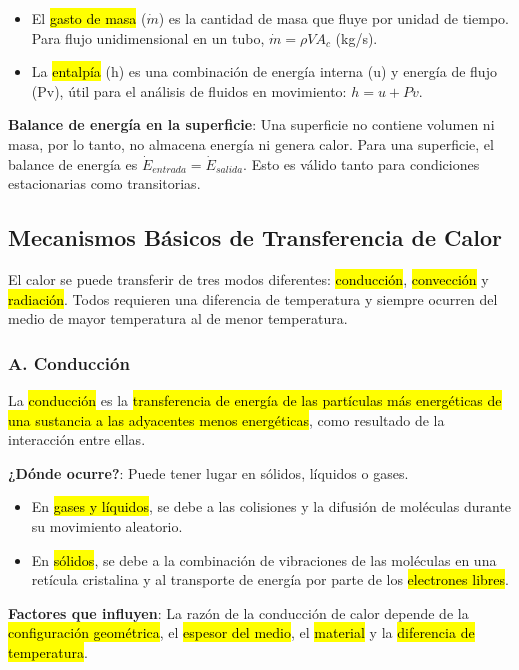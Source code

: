 \documentclass{article}
\begin{document}
    \begin{itemize}
        \item El \hl{gasto de masa} ($\dot{m}$) es la cantidad de masa que fluye por unidad de tiempo. Para flujo unidimensional en un tubo, $\dot{m} = \rho V A_c$ (kg/s).
        \item La \hl{entalpía} (h) es una combinación de energía interna (u) y energía de flujo (Pv), útil para el análisis de fluidos en movimiento: $h = u + Pv$.
    \end{itemize}

    \textbf{Balance de energía en la superficie}: Una superficie no contiene volumen ni masa, por lo tanto, no almacena energía ni genera calor. Para una superficie, el balance de energía es $\dot{E}_{entrada} = \dot{E}_{salida}$. Esto es válido tanto para condiciones estacionarias como transitorias.

    \subsection{Mecanismos Básicos de Transferencia de Calor}

    El calor se puede transferir de tres modos diferentes: \hl{conducción}, \hl{convección} y \hl{radiación}. Todos requieren una diferencia de temperatura y siempre ocurren del medio de mayor temperatura al de menor temperatura.

    \subsubsection{A. Conducción}

    La \hl{conducción} es la \hl{transferencia de energía de las partículas más energéticas de una sustancia a las adyacentes menos energéticas}, como resultado de la interacción entre ellas.

    \textbf{¿Dónde ocurre?}: Puede tener lugar en sólidos, líquidos o gases.
    \begin{itemize}
        \item En \hl{gases y líquidos}, se debe a las colisiones y la difusión de moléculas durante su movimiento aleatorio.
        \item En \hl{sólidos}, se debe a la combinación de vibraciones de las moléculas en una retícula cristalina y al transporte de energía por parte de los \hl{electrones libres}.
    \end{itemize}

    \textbf{Factores que influyen}: La razón de la conducción de calor depende de la \hl{configuración geométrica}, el \hl{espesor del medio}, el \hl{material} y la \hl{diferencia de temperatura}.
\end{document}
